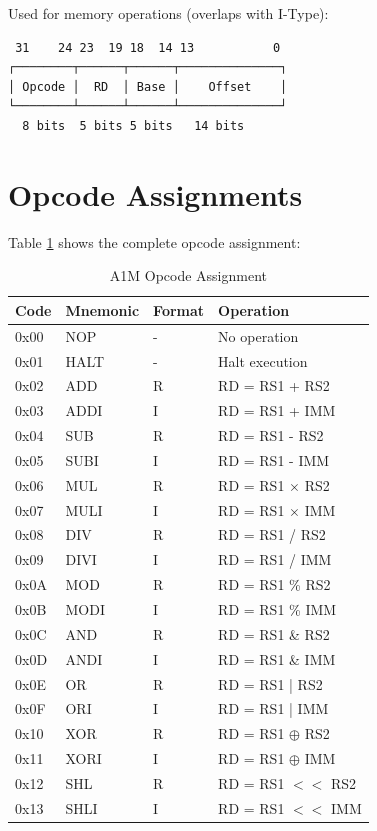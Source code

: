 \documentclass[12pt,a4paper,oneside]{book}
\begin{document}
Used for memory operations (overlaps with I-Type):

\begin{verbatim}
 31    24 23  19 18  14 13           0
┌────────┬──────┬──────┬──────────────┐
│ Opcode │  RD  │ Base │    Offset    │
└────────┴──────┴──────┴──────────────┘
  8 bits  5 bits 5 bits   14 bits
\end{verbatim}

\section{Opcode Assignments}

Table \ref{tab:opcodes} shows the complete opcode assignment:

\begin{table}[H]
\centering
\caption{A1M Opcode Assignment}
\label{tab:opcodes}
\small
\begin{tabularx}{\textwidth}{|l|l|l|X|}
\hline
\textbf{Code} & \textbf{Mnemonic} & \textbf{Format} & \textbf{Operation} \\
\hline
0x00 & NOP & - & No operation \\
0x01 & HALT & - & Halt execution \\
\hline
0x02 & ADD & R & RD = RS1 + RS2 \\
0x03 & ADDI & I & RD = RS1 + IMM \\
0x04 & SUB & R & RD = RS1 - RS2 \\
0x05 & SUBI & I & RD = RS1 - IMM \\
0x06 & MUL & R & RD = RS1 $\times$ RS2 \\
0x07 & MULI & I & RD = RS1 $\times$ IMM \\
0x08 & DIV & R & RD = RS1 / RS2 \\
0x09 & DIVI & I & RD = RS1 / IMM \\
0x0A & MOD & R & RD = RS1 \% RS2 \\
0x0B & MODI & I & RD = RS1 \% IMM \\
\hline
0x0C & AND & R & RD = RS1 \& RS2 \\
0x0D & ANDI & I & RD = RS1 \& IMM \\
0x0E & OR & R & RD = RS1 | RS2 \\
0x0F & ORI & I & RD = RS1 | IMM \\
0x10 & XOR & R & RD = RS1 $\oplus$ RS2 \\
0x11 & XORI & I & RD = RS1 $\oplus$ IMM \\
0x12 & SHL & R & RD = RS1 $<<$ RS2 \\
0x13 & SHLI & I & RD = RS1 $<<$ IMM \\

\end{tabularx}
\end{table}
\end{document}
